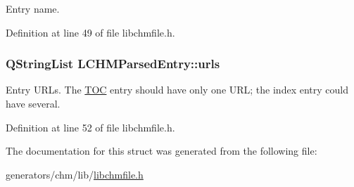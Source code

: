Entry name. 



Definition at line 49 of file libchmfile.\+h.

\hypertarget{structLCHMParsedEntry_aa871a08e7fca4ae8e23983ff299bd24f}{
\subsubsection[{urls}]{\setlength{\rightskip}{0pt plus 5cm}Q\+String\+List L\+C\+H\+M\+Parsed\+Entry\+::urls}}\label{structLCHMParsedEntry_aa871a08e7fca4ae8e23983ff299bd24f}


Entry U\+R\+Ls. The \hyperlink{classTOC}{T\+O\+C} entry should have only one U\+R\+L; the index entry could have several. 



Definition at line 52 of file libchmfile.\+h.



The documentation for this struct was generated from the following file\+:\begin{DoxyCompactItemize}
\item 
generators/chm/lib/\hyperlink{libchmfile_8h}{libchmfile.\+h}\end{DoxyCompactItemize}

